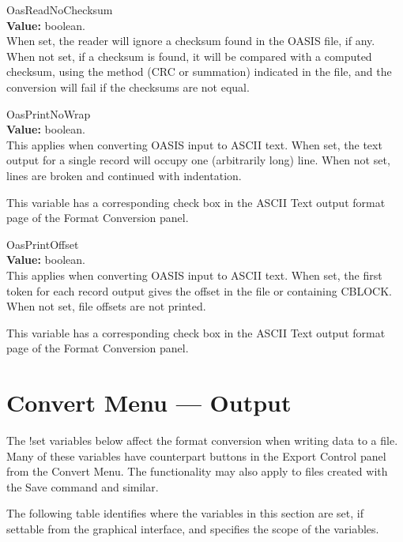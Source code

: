 \begin{description}
\item{\et OasReadNoChecksum}\\
{\bf Value:} boolean.\\
When set, the reader will ignore a checksum found in the OASIS file,
if any.  When not set, if a checksum is found, it will be compared
with a computed checksum, using the method (CRC or summation)
indicated in the file, and the conversion will fail if the checksums
are not equal.

\item{\et OasPrintNoWrap}\\
{\bf Value:} boolean.\\
This applies when converting OASIS input to ASCII text.  When set, the
text output for a single record will occupy one (arbitrarily long)
line.  When not set, lines are broken and continued with indentation.

This variable has a corresponding check box in the {\cb ASCII Text}
output format page of the {\cb Format Conversion} panel.

\item{\et OasPrintOffset}\\
{\bf Value:} boolean.\\
This applies when converting OASIS input to ASCII text.  When set, the
first token for each record output gives the offset in the file or
containing CBLOCK.  When not set, file offsets are not printed.

This variable has a corresponding check box in the {\cb ASCII Text}
output format page of the {\cb Format Conversion} panel.
\end{description}


\section{Convert Menu --- Output}

The {\cb !set} variables below affect the format conversion when
writing data to a file.  Many of these variables have counterpart
buttons in the {\cb Export Control} panel from the {\cb Convert Menu}. 
The functionality may also apply to files created with the {\cb Save}
command and similar.

The following table identifies where the variables in this section are
set, if settable from the graphical interface, and specifies the scope
of the variables.

